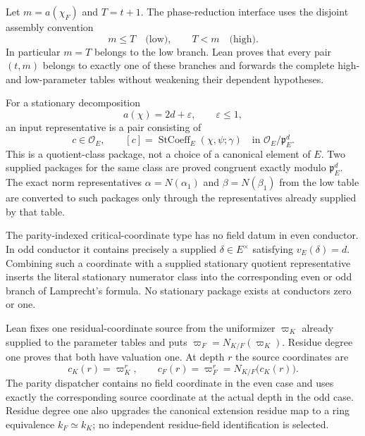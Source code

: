 \begin{definition}
\label{mod:parameters-phasereduction}
Let $m=a(\chi_F)$ and $T=t+1$.  The phase-reduction interface uses the
disjoint assembly convention
\[
  m\leq T\quad\text{(low)},
  \qquad
  T<m\quad\text{(high)}.
\]
In particular $m=T$ belongs to the low branch.  Lean proves that every
pair $(t,m)$ belongs to exactly one of these branches and forwards the
complete high- and low-parameter tables without weakening their dependent
hypotheses.

For a stationary decomposition
\[
  a(\chi)=2d+\varepsilon,
  \qquad \varepsilon\leq1,
\]
an input representative is a pair consisting of
\[
  c\in\mathcal O_E,
  \qquad
  [c]=\operatorname{StCoeff}_E(\chi,\psi;\gamma)
       \quad\text{in }\mathcal O_E/\mathfrak p_E^d.
\]
This is a quotient-class package, not a choice of a canonical element of
$E$.  Two supplied packages for the same class are proved congruent exactly
modulo $\mathfrak p_E^d$.  The exact norm representatives $\alpha=N(\alpha_1)$
and $\beta=N(\beta_1)$ from the low table are converted to such packages
only through the representatives already supplied by that table.

The parity-indexed critical-coordinate type has no field datum in even
conductor.  In odd conductor it contains precisely a supplied
$\delta\in E^\times$ satisfying $v_E(\delta)=d$.  Combining such a coordinate
with a supplied stationary quotient representative inserts the literal
stationary numerator class into the corresponding even or odd branch of
Lamprecht's formula.  No stationary package exists at conductors zero or
one.

Lean fixes one residual-coordinate source from the uniformizer $\varpi_K$
already supplied to the parameter tables and puts
$\varpi_F=N_{K/F}(\varpi_K)$.  Residue degree one proves that both have
valuation one.  At depth $r$ the source coordinates are
\[
 c_K(r)=\varpi_K^r,
 \qquad c_F(r)=\varpi_F^r=N_{K/F}\bigl(c_K(r)\bigr).
\]
The parity dispatcher contains no field coordinate in the even case and
uses exactly the corresponding source coordinate at the actual depth in the
odd case.  Residue degree one also upgrades the canonical extension residue
map to a ring equivalence $k_F\simeq k_K$; no independent residue-field
identification is selected.


\end{definition}
